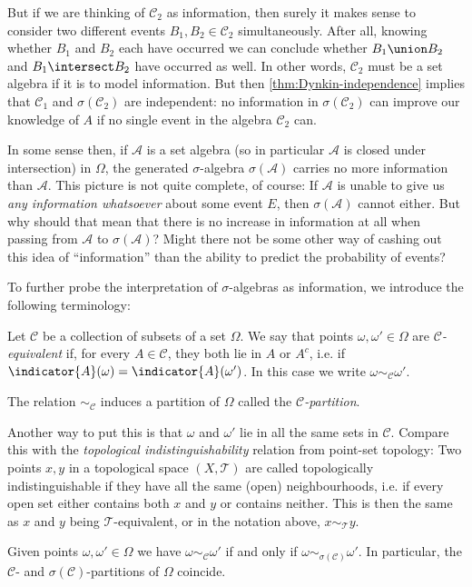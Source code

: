 \documentclass[article, a4paper, 11pt, oneside]{memoir}
\numberwithin{equation}{chapter}
\newcommand{\calT}{\mathcal{T}}
\newcommand{\calA}{\mathcal{A}}
\newcommand{\calC}{\mathcal{C}}
\begin{document}
But if we are thinking of $\calC_2$ as information, then surely it makes sense to consider two different events $B_1, B_2 \in \calC_2$ simultaneously. After all, knowing whether $B_1$ and $B_2$ each have occurred we can conclude whether $B_1 \union B_2$ and $B_1 \intersect B_2$ have occurred as well. In other words, $\calC_2$ must be a set algebra if it is to model information. But then \cref{thm:Dynkin-independence} implies that $\calC_1$ and $\sigma(\calC_2)$ are independent: no information in $\sigma(\calC_2)$ can improve our knowledge of $A$ if no single event in the algebra $\calC_2$ can.

In some sense then, if $\calA$ is a set algebra (so in particular $\calA$ is closed under intersection) in $\Omega$, the generated $\sigma$-algebra $\sigma(\calA)$ carries no more information than $\calA$. This picture is not quite complete, of course: If $\calA$ is unable to give us \emph{any information whatsoever} about some event $E$, then $\sigma(\calA)$ cannot either. But why should that mean that there is no increase in information at all when passing from $\calA$ to $\sigma(\calA)$? Might there not be some other way of cashing out this idea of \enquote{information} than the ability to predict the probability of events?

To further probe the interpretation of $\sigma$-algebras as information, we introduce the following terminology:

\begin{definition}
    Let $\calC$ be a collection of subsets of a set $\Omega$. We say that points $\omega, \omega' \in \Omega$ are \emph{$\calC$-equivalent} if, for every $A \in \calC$, they both lie in $A$ or $A^c$, i.e. if $\indicator{A}(\omega) = \indicator{A}(\omega')$. In this case we write $\omega \sim_\calC \omega'$.

    The relation $\sim_\calC$ induces a partition of $\Omega$ called the \emph{$\calC$-partition}.
\end{definition}
%
Another way to put this is that $\omega$ and $\omega'$ lie in all the same sets in $\calC$. Compare this with the \emph{topological indistinguishability} relation from point-set topology: Two points $x,y$ in a topological space $(X,\calT)$ are called topologically indistinguishable if they have all the same (open) neighbourhoods, i.e. if every open set either contains both $x$ and $y$ or contains neither. This is then the same as $x$ and $y$ being $\calT$-equivalent, or in the notation above, $x \sim_\calT y$.

\begin{lemma}
    Given points $\omega, \omega' \in \Omega$ we have $\omega \sim_\calC \omega'$ if and only if $\omega \sim_{\sigma(\calC)} \omega'$. In particular, the $\calC$- and $\sigma(\calC)$-partitions of $\Omega$ coincide.
\end{lemma}
\end{document}
